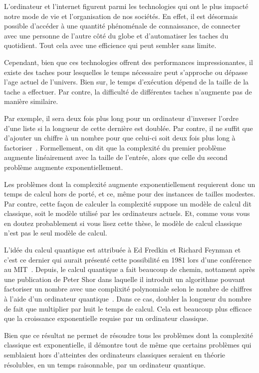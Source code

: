 \begin{comment}
\end{comment}

\Introduction   %

L'ordinateur et l'internet figurent parmi les technologies qui ont le plus impacté
notre mode de vie et l'organisation de nos sociétés.
En effet,
il est désormais possible d'accéder à une quantité phénoménale de connaissance,
de connecter avec une personne de l'autre côté du globe
et d'automatiser les taches du quotidient.
Tout cela avec une efficience qui peut sembler sans limite.

Cependant, 
bien que ces technologies offrent des performances impressionantes,
il existe des taches pour lesquelles le temps nécessaire peut s'approche ou
dépasse l'age actuel de l'univers.
Bien sur,
le temps d'exécution dépend de la taille de la tache a effectuer.
Par contre, 
la difficulté de différentes taches n'augmente pas de manière similaire.

Par exemple,
il sera deux fois plus long pour un ordinateur d'inverser l'ordre d'une liste 
si la longueur de cette dernière est doublée.
Par contre,
il ne suffit que d'ajouter un chiffre à un nombre pour que celui-ci soit deux 
fois plus long à factoriser~\cite{arora_computational_2009}.
Formellement,
on dit que la complexité du premier problème augmente linéairement avec la taille de l'entrée,
alors que celle du second problème augmente exponentiellement.

Les problèmes dont la complexité augmente exponentiellement requierent donc un temps de calcul
hors de porté, et ce, même pour des instances de tailles modestes.
Par contre,
cette façon de calculer la complexité suppose un modèle de calcul dit classique,
soit le modèle utilisé par les ordinateurs actuels.
Et,
comme vous vous en doutez probablement si vous lisez cette thèse,
le modèle de calcul classique n'est pas le seul modèle de calcul.

L'idée du calcul quantique est attribuée à Ed Fredkin et Richard Feynman et 
c'est ce dernier qui aurait présenté cette possibilité en 1981 lors d'une conférence au MIT~\cite{hoofnagle_birth_2021}.
Depuis,
le calcul quantique a fait beaucoup de chemin,
nottament après une publication de Peter Shor dans laquelle il introduit un 
algorithme pouvant factoriser un nombre avec une complixité polynomiale selon
le nombre de chiffres à l'aide d'un ordinateur quantique~\cite{shor_algorithms_1994}.
Dans ce cas,
doubler la longueur du nombre de fait que multiplier par huit le temps de calcul.
Cela est beaucoup plus efficace que la croissance exponentielle requise par un ordinateur classique.

Bien que ce résultat ne permet de résoudre tous les problèmes dont la complexité classique
est exponentielle,
il démontre tout de même que certains problèmes qui semblaient hors d'atteintes des ordinateurs
classiques seraient en théorie résolubles, en un temps raisonnable, par un ordinateur quantique.




